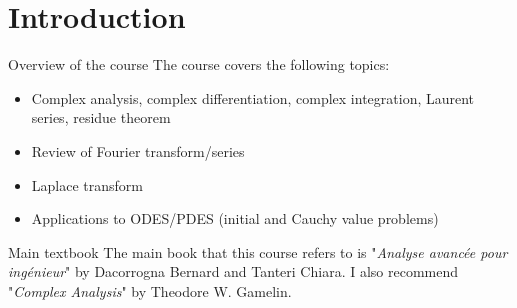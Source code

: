 \documentclass[a4paper]{book}
\begin{document}
\newpage


\tableofcontents
\newpage

\section*{Introduction}
\begin{parag}{Overview of the course}
	The course covers the following topics:
    \begin{itemize}
		\item Complex analysis, complex differentiation, complex integration, Laurent series, residue theorem
		\item Review of Fourier transform/series
		\item Laplace transform
		\item Applications to ODES/PDES (initial and Cauchy value problems)
    \end{itemize}
\end{parag}
\begin{parag}{Main textbook}
	The main book that this course refers to is "\textit{Analyse avancée pour ingénieur}" by Dacorrogna Bernard and Tanteri Chiara. I also recommend  "\textit{Complex Analysis}" by Theodore W. Gamelin.
    
\end{parag}

















\end{document}
